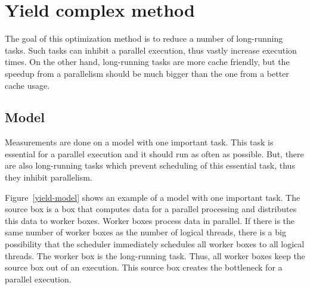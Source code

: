 \section{Yield complex method}
The goal of this optimization method is to reduce a number of long-running tasks. Such tasks can inhibit a parallel execution, thus vastly increase execution times. On the other hand, long-running tasks are more cache friendly, but the speedup from a parallelism should be much bigger than the one from a better cache usage.

\subsection{Model}
Measurements are done on a model with one important task. This task is essential for a parallel execution and it should run as often as possible. But, there are also long-running tasks which prevent scheduling of this essential task, thus they inhibit parallelism.

Figure~\ref{yield-model} shows an example of a model with one important task. The source box is a box that computes data for a parallel processing and distributes this data to worker boxes. Worker boxes process data in parallel. If there is the same number of worker boxes as the number of logical threads, there is a big possibility that the scheduler immediately schedules all worker boxes to all logical threads. The worker box is the long-running task. Thus, all worker boxes keep the source box out of an execution. This source box creates the bottleneck for a parallel execution.

